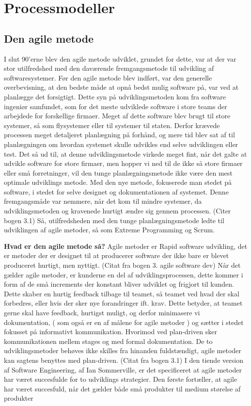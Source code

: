 \chapter{Processmodeller}\label{ch:processmodeller}

\section{Den agile metode}
I slut 90’erne blev den agile metode udviklet, grundet for dette, var at der var stor utilfredshed med den daværende fremgangsmetode til udvikling af softwaresystemer. Før den agile metode blev indført, var den generelle overbevisning, at den bedste måde at opnå bedst mulig software på, var ved at planlægge det forsigtigt. Dette syn på udviklingsmetoden kom fra software ingeniør samfundet, som for det meste udviklede software i store teams der arbejdede for forskellige firmaer. Meget af dette software blev brugt til store systemer, så som flysystemer eller til systemer til staten. Derfor krævede processen meget detaljeret planlægning på forhånd, og mere tid blev sat af til planlægningen om hvordan systemet skulle udvikles end selve udviklingen eller test. 
Det så ud til, at denne udviklingsmetode virkede meget fint, når det galte at udvikle software for store firmaer, men hopper vi ned til de ikke så store firmaer eller små forretninger, vil den tunge planlægningsmetode ikke være den mest optimale udviklings metode. Med den nye metode, fokuserede man stedet på software, i stedet for selve designet og dokumentationen af systemet. Denne fremgangsmåde var nemmere, når det kom til mindre systemer, da  udviklingsmetoden og kravenede hurtigt ændre sig gennem processen. (Citer bogen 3.1)
Så, utilfredsheden med den tunge planlægningsmetode ledte til udviklingen af agile metoder, så som Extreme Programming og Scrum. 

\textbf{Hvad er den agile metode så?} 
Agile metoder er Rapid software udvikling, det er metoder der er designet til at producerer software der ikke bare er blevet produceret hurtigt, men nyttigt. (Citat fra bogen 3. agile software dev) Når det gælder agile metoder, er kunderne en del af udviklingsprocessen, dette kommer i form af de små increments der konstant bliver udviklet og frigjort til kunden. Dette skaber en hurtig feedback tilbage til teamet, så teamet ved hvad der skal forbedres, eller hvis der sker nye forandringer ift. krav. Dette betyder, at teamet gerne skal have feedback, hurtigst muligt, og derfor minimasere vi dokumentation, ( som også er en af målene for agile metoder ) og sætter i stedet fokusset på informativt kommunikation. Hvorimod ved plan-driven sker kommunikationen mellem stages og med formal dokumentation. De to udviklingsmetoder behøves ikke skilles fra hinanden fuldstændigt, agile metoder kan sagtens benyttes med plan-driven. (Citat fra bogen 3.1) 
I den tiende version af Software Engineering, af Ian Sommerville, er det specificeret at agile metoder har været succesfulde for to udviklings strategier. Den første fortæller, at agile har været succesfuld, når det gælder både små produkter til medium størelse af produkter 



